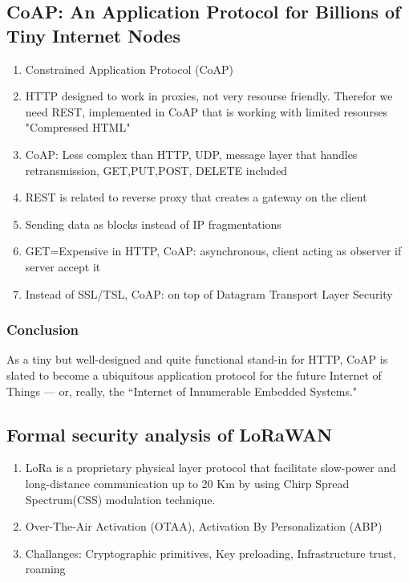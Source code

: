 \documentclass[../../../main.tex]{subfiles}
\begin{document}
\subsection{CoAP: An Application Protocol for Billions of Tiny Internet Nodes}
\begin{enumerate}
    \item Constrained Application Protocol (CoAP)
    \item HTTP designed to work in proxies, not very resourse friendly. Therefor we need REST, implemented in CoAP that is working with limited resourses "Compressed HTML"
    \item CoAP: Less complex than HTTP, UDP, message layer that handles retransmission, GET,PUT,POST, DELETE included
    \item REST is related to reverse proxy that creates a gateway on the client
    \item Sending data as blocks instead of IP fragmentations
    \item GET=Expensive in HTTP, CoAP:  asynchronous, client acting as observer if server accept it
    \item Instead of SSL/TSL, CoAP: on top of  Datagram  Transport  Layer  Security  
\end{enumerate}
\subsubsection{Conclusion}
As  a  tiny  but  well-designed  and  quite  functional  stand-in  for  HTTP,  CoAP  is  slated  to  become  a  ubiquitous  application  protocol  for  the  future  Internet  of  Things  —  or,  really,  the  “Internet  of  Innumerable  Embedded Systems."

\subsection{Formal security analysis of LoRaWAN}
\begin{enumerate}
    \item LoRa is a proprietary physical layer protocol that facilitate slow-power and long-distance communication up to 20 Km by using Chirp Spread Spectrum(CSS) modulation technique.
    \item Over-The-Air Activation (OTAA), Activation By Personalization (ABP)
    \item Challanges: Cryptographic primitives, Key preloading, Infrastructure trust, roaming
\end{enumerate}
\end{document}
